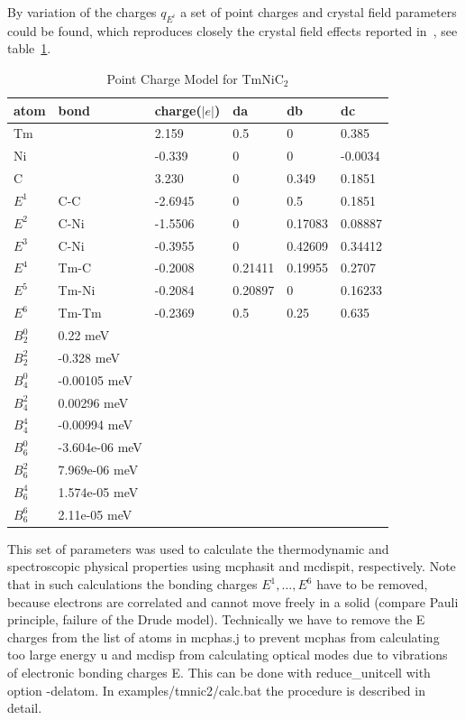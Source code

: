 By variation of the charges $q_{E^i}$ a set of point charges and crystal field parameters
could be found, which reproduces closely the crystal field effects reported in~\cite{roman23-125137}, see
table~\ref{pcmodel}.

\begin{table}[thb] 
\begin{center}  
\caption {Point Charge Model for TmNiC$_2$}  
\label{pcmodel} 
\begin{tabular} 
{l|l|l|l|l|l}
atom	& bond	& charge($|e|$) & da  & db    & dc \\
\hline
Tm	&	& 2.159	    & 0.5   &	0   &	0.385 \\
Ni	&	& -0.339    & 0	    &	0   &	-0.0034 \\
C	&	& 3.230	    & 0	    & 0.349 &	0.1851  \\
$E^1$	& C-C	& -2.6945   & 0	    &	0.5 &	0.1851  \\
$E^2$	& C-Ni  & -1.5506   & 0	    &	0.17083&0.08887  \\
$E^3$	& C-Ni  & -0.3955   & 0	    &	0.42609&0.34412  \\
$E^4$	& Tm-C  & -0.2008   & 0.21411&	0.19955&0.2707  \\
$E^5$	& Tm-Ni & -0.2084   & 0.20897&	0   &	0.16233  \\
$E^6$	& Tm-Tm & -0.2369   & 0.5   &	0.25&	0.635  \\
\hline
$B_2^0$ & 0.22 meV &&&\\
$B_2^2$ &-0.328 meV &&&\\
$B_4^0$ &-0.00105 meV &&&\\
$B_4^2$ & 0.00296 meV &&&\\
$B_4^4$ &-0.00994 meV &&&\\
$B_6^0$ &-3.604e-06 meV &&&\\
$B_6^2$ & 7.969e-06 meV &&&\\
$B_6^4$ & 1.574e-05 meV &&&\\
$B_6^6$ & 2.11e-05 meV &&&\\
\end{tabular}
\end{center}   
\end{table}

This set of parameters was used to calculate the thermodynamic and spectroscopic physical properties
using {\prg mcphasit} and {\prg mcdispit}, respectively. Note that in such calculations the
bonding charges $E^1, \dots, E^6$ have to be removed, because electrons are correlated and 
cannot move freely in a solid (compare Pauli principle, failure of the Drude model).
Technically we have to remove the E charges from the list of atoms in 
{\prg mcphas.j} to prevent {\prg mcphas} from calculating too large energy u and {\prg mcdisp} 
from calculating optical modes due to vibrations of electronic bonding charges E.
This can be done with {\prg reduce\_unitcell} with option {\prg -delatom}.
In {\prg examples/tmnic2/calc.bat } the procedure is described in detail.


